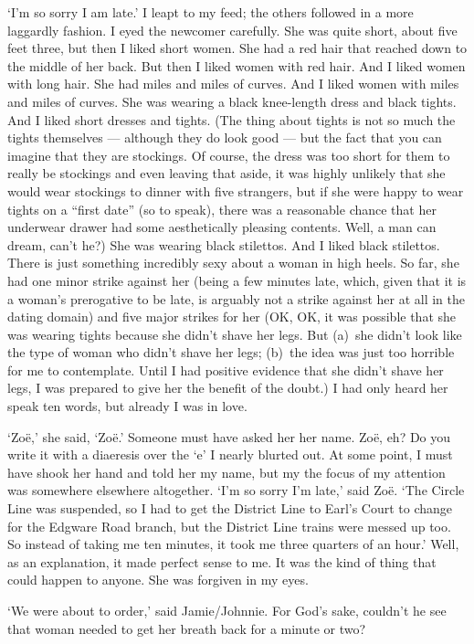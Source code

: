 `I'm so sorry I am late.' I leapt to my feed; the others
followed in a more laggardly fashion. I eyed the newcomer carefully. She was quite short, about five
feet three, but then I liked short women. She had a red hair that
reached down to the middle of her back. But then I liked women with
red hair. And I liked women with long hair. She had miles and miles
of curves. And I liked women with miles and miles of curves. She was
wearing a black knee-length dress and black tights. And I liked
short dresses and tights. (The thing about tights is not so much the tights
themselves --- although they do look good --- but the fact that you can imagine that they are
stockings. Of course, the dress was too short for them to really be
stockings and even leaving that aside, it was highly unlikely that
she would wear stockings to dinner with five strangers, but if she were happy to wear tights on a ``first
date'' (so to speak), there was a reasonable chance that her
underwear drawer had some aesthetically pleasing contents. Well, a
man can dream, can't he?) She was wearing black stilettos. And I
liked black stilettos. There is just something incredibly sexy about
a woman in high heels. So far, she had one minor strike against her
(being a few minutes late, which, given that it is a woman's
prerogative to be late, is arguably not a strike against her at all in the
dating domain) and five major strikes for her (OK, OK, it was
possible that she was wearing tights because she didn't shave her
legs. But (a)~she didn't look like the type of woman who didn't shave her legs;
(b)~the idea was just too horrible for me to contemplate. Until I
had positive evidence that she didn't shave her legs, I was prepared
to give her the benefit of the doubt.) I had only heard her speak
ten words, but already I was in love.

`Zoë,' she said, `Zoë.' Someone must have asked her her
name. Zoë, eh? Do you write it with a diaeresis over the `e' I
nearly blurted out. At some point, I must have shook her hand and
told her my name, but my the focus of my attention was somewhere elsewhere altogether. `I'm so sorry I'm
late,' said Zoë. `The Circle Line was suspended, so I had to get the District
Line to Earl's Court to change for the Edgware Road branch, but the District Line trains were messed up too. So
instead of taking me ten minutes, it took me three quarters of an
hour.' Well, as an explanation, it made perfect sense to me. It was the kind of thing
that could happen to anyone. She was forgiven in my eyes.

`We were about to order,' said Jamie/Johnnie. For God's sake,
couldn't he see that woman needed to get her breath back for a
minute or two?

